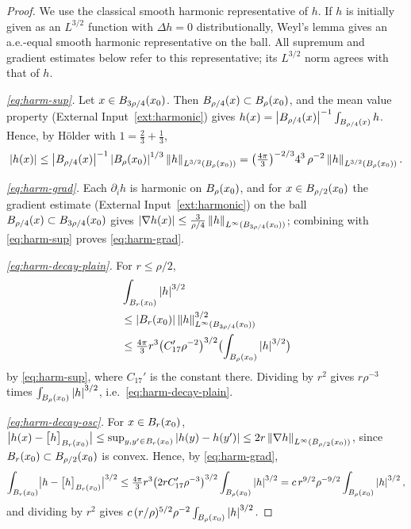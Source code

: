 \documentclass[11pt,reqno]{amsart}
\begin{document}
\begin{proof}
We use the classical smooth harmonic representative of $h$.
If $h$ is initially given as an $L^{3/2}$ function with $\Delta h=0$
distributionally, Weyl's lemma gives an a.e.-equal smooth harmonic
representative on the ball. All supremum and gradient estimates below
refer to this representative; its $L^{3/2}$ norm agrees with that of $h$.

\emph{\eqref{eq:harm-sup}.} Let $x\in B_{3\rho/4}(x_{0})$. Then
$B_{\rho/4}(x)\subset B_{\rho}(x_{0})$, and the mean value property
(External Input~\ref{ext:harmonic}) gives
$h(x)=\left\lvert B_{\rho/4}(x) \right\rvert^{-1}\int_{B_{\rho/4}(x)}h$. Hence, by H\"older
with $1=\tfrac23+\tfrac13$,
\[
  \left\lvert h(x) \right\rvert\le\left\lvert B_{\rho/4}(x) \right\rvert^{-1}\left\lvert B_{\rho}(x_{0}) \right\rvert^{1/3}
     \left\lVert h \right\rVert_{L^{3/2}(B_{\rho}(x_{0}))}
  =\bigl(\tfrac{4\pi}{3}\bigr)^{-2/3}4^{3}\,\rho^{-2}
     \left\lVert h \right\rVert_{L^{3/2}(B_{\rho}(x_{0}))} .
\]

\emph{\eqref{eq:harm-grad}.} Each $\partial_{i}h$ is harmonic on
$B_{\rho}(x_{0})$, and for $x\in B_{\rho/2}(x_{0})$ the gradient estimate
(External Input~\ref{ext:harmonic}) on the ball $B_{\rho/4}(x)\subset
B_{3\rho/4}(x_{0})$ gives
$\left\lvert \nabla h(x) \right\rvert\le\tfrac{3}{\rho/4}\left\lVert h \right\rVert_{L^{\infty}(B_{3\rho/4}(x_{0}))}$;
combining with \eqref{eq:harm-sup} proves \eqref{eq:harm-grad}.

\emph{\eqref{eq:harm-decay-plain}.} For $r\le\rho/2$,
\[
\begin{aligned}
&\int_{B_{r}(x_{0})}\left\lvert h \right\rvert^{3/2}
\\ &\le\left\lvert B_{r}(x_{0}) \right\rvert
 \left\lVert h \right\rVert_{L^{\infty}(B_{3\rho/4}(x_{0}))}^{3/2}
\\ &\le\tfrac{4\pi}{3}r^{3}\bigl(C_{17}'\rho^{-2}\bigr)^{3/2}
 \bigl(\int_{B_{\rho}(x_{0})}\left\lvert h \right\rvert^{3/2}\bigr)
\end{aligned}
\]
 by \eqref{eq:harm-sup},
where $C_{17}'$ is the constant there. Dividing by $r^{2}$ gives
$r\rho^{-3}$ times $\int_{B_{\rho}(x_{0})}\left\lvert h \right\rvert^{3/2}$, i.e.\
\eqref{eq:harm-decay-plain}.

\emph{\eqref{eq:harm-decay-osc}.} For $x\in B_{r}(x_{0})$,
$\bigl|h(x)-\bigl[h\bigr]_{B_{r}(x_{0})}\bigr|
 \le\sup_{y,y'\in B_{r}(x_{0})}\left\lvert h(y)-h(y') \right\rvert
 \le2r\left\lVert \nabla h \right\rVert_{L^{\infty}(B_{\rho/2}(x_{0}))}$, since
$B_{r}(x_{0})\subset B_{\rho/2}(x_{0})$ is convex. Hence, by
\eqref{eq:harm-grad},
\[
  \int_{B_{r}(x_{0})}\bigl|h-\bigl[h\bigr]_{B_{r}(x_{0})}\bigr|^{3/2}
  \le\tfrac{4\pi}{3}r^{3}\bigl(2rC_{17}'\rho^{-3}\bigr)^{3/2}
     \int_{B_{\rho}(x_{0})}\left\lvert h \right\rvert^{3/2}
  = c\,r^{9/2}\rho^{-9/2}\int_{B_{\rho}(x_{0})}\left\lvert h \right\rvert^{3/2},
\]
and dividing by $r^{2}$ gives $c\,(r/\rho)^{5/2}\rho^{-2}
\int_{B_{\rho}(x_{0})}\left\lvert h \right\rvert^{3/2}$.
\end{proof}
\end{document}

